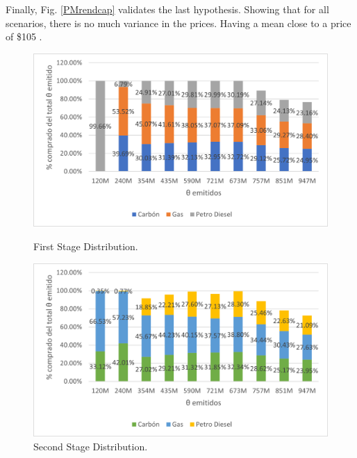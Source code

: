 \documentclass[a4paper,fleqn]{cas-dc}
\begin{document}
Finally, Fig. \ref{PMrendcap} validates the last hypothesis. Showing that for all scenarios, there is no much variance in the prices. Having a mean close to a price of \$105 .

\begin{figure}[h]
  \centering
  \begin{minipage}[b]{0.49\textwidth}
    \includegraphics[width=\textwidth]{Submissions/EnergyPolicy/Images/distr primera etapa precision.png}
    \caption{{\footnotesize First Stage Distribution.}}
    \label{distriMP1}
  \end{minipage}
  \hfill
  \begin{minipage}[b]{0.49\textwidth}
    \includegraphics[width=\textwidth]{Submissions/EnergyPolicy/Images/distr segunda etapa precision.png}
    \caption{{\footnotesize Second Stage Distribution.}}
     \label{distriMP3}
  \end{minipage}
\end{figure}
\end{document}
